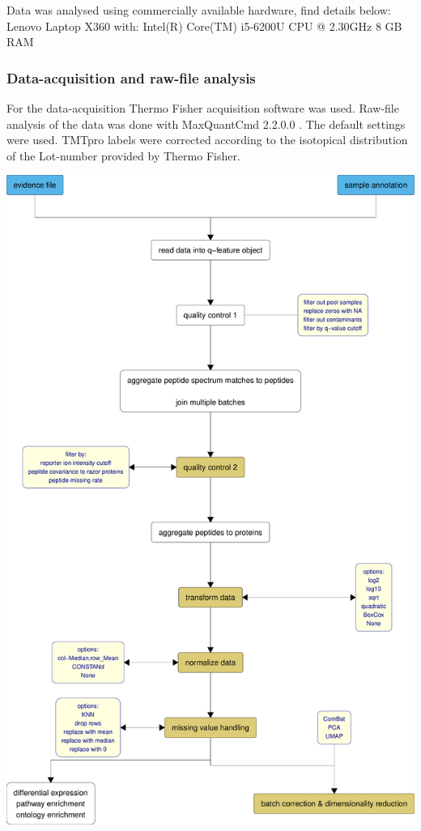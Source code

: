 \documentclass[
  11pt,
]{article}
\let\origfigure\figure
\begin{document}
Data was analysed using commercially available hardware, find details below:
Lenovo Laptop X360 with:
Intel(R) Core(TM) i5-6200U CPU @ 2.30GHz
8 GB RAM

\hypertarget{data-acquisition-and-raw-file-analysis}{%
\subsubsection{Data-acquisition and raw-file analysis}\label{data-acquisition-and-raw-file-analysis}}

For the data-acquisition Thermo Fisher acquisition software was used.
Raw-file analysis of the data was done with MaxQuantCmd 2.2.0.0 \citep{Cox2008}.
The default settings were used. TMTpro labels were corrected according to the isotopical distribution of the Lot-number provided by Thermo Fisher.

\bgroup  \origfigure[H] 

{\centering \includegraphics[width=0.8\linewidth]{Thesis_files/figure-latex/data-processing-pipeline-flowchart-vertical-1} 

}
\end{document}
